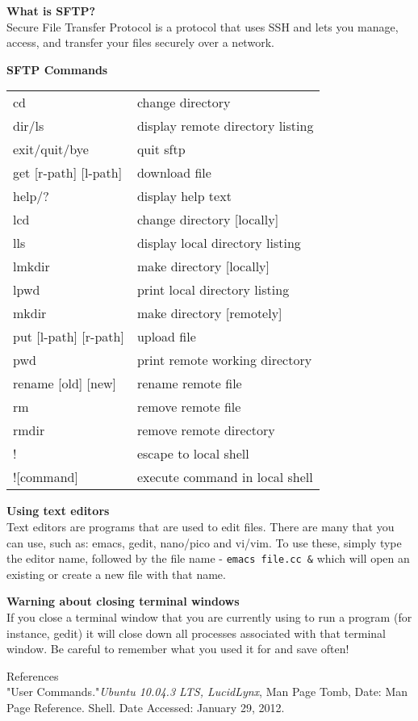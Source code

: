 \documentclass[a4paper]{article}
\begin{document}
\begin{landscape}
\begin{multicols}{3}
\vspace{2mm}
\textbf{What is SFTP?}\\
Secure File Transfer Protocol is a protocol that uses SSH
and lets you manage, access, and transfer your files
securely over a network.

\vspace{2mm}
\textbf{SFTP Commands}\\
\begin{tabular}{ l l }
cd & change directory\\
dir/ls & display remote directory listing\\
exit/quit/bye & quit sftp\\
get [r-path] [l-path] & download file\\
help/? & display help text\\
lcd & change directory [locally]\\
lls & display local directory listing\\
lmkdir & make directory [locally]\\
lpwd & print local directory listing\\
mkdir & make directory [remotely]\\
put [l-path] [r-path] & upload file\\
pwd & print remote working directory\\
rename [old] [new] & rename remote file\\
rm & remove remote file\\
rmdir & remove remote directory\\
! & escape to local shell\\
![command] & execute command in local shell\\
\end{tabular}

\vspace{2mm}
\textbf{Using text editors}\\
Text editors are programs that are used to edit files. There
are many that you can use, such as: emacs, gedit, nano/pico
and vi/vim. To use these, simply type the editor name,
followed by the file name - \verb+emacs file.cc &+ which
will open an existing or create a new file with that name.

\vspace{2mm}
\textbf{Warning about closing terminal windows}\\
If you close a terminal window that you are currently using
to run a program (for instance, gedit) it will close down all
processes associated with that terminal window. Be careful
to remember what you used it for and save often!

\vspace{2mm}
References\\
"User Commands."\textit{Ubuntu 10.04.3 LTS, LucidLynx}, Man
Page Tomb, Date: Man Page Reference. Shell. Date
Accessed: January 29, 2012.

\end{multicols}
\end{landscape}
\end{document}
